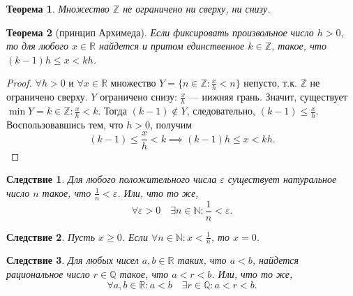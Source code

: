 \documentclass[a4paper,12pt]{article} %
\newtheorem{theorem}{Теорема}[section]
\newtheorem{corollary}{Следствие}[theorem]
\theoremstyle{remark}
\theoremstyle{definition}
\begin{document}
\begin{theorem}
    Множество $\mathbb{Z}$ не ограничено ни сверху, ни снизу.
\end{theorem}

\begin{theorem}[принцип Архимеда]
    Если фиксировать произвольное число $h>0$, то для любого $x\in \mathbb{R}$ найдется и притом единственное $k\in \mathbb{Z}$,
    такое, что $(k-1)h \le  x < kh$.
\end{theorem}
\begin{proof}
    $\forall h>0$ и $\forall x \in \mathbb{R}$ множество $\displaystyle Y = \{n \in \mathbb{Z} : \frac{x}{h} < n\}$ непусто,
    т.к. $\mathbb{Z}$ не ограничено сверху. $Y$ ограничено снизу: $\displaystyle \frac{x}{h}$ --- нижняя грань.
    Значит, существует $\displaystyle \min Y = k\in \mathbb{Z} : \frac{x}{h} < k$. Тогда $(k-1)\not \in Y$,
    следовательно, $\displaystyle (k-1) \le \frac{x}{h}$. Воспользовавшись тем, что $h > 0$, получим
    \[(k-1)\le \frac{x}{h} < k \implies (k-1)h \le x < kh.\] 
\end{proof}
\begin{corollary}
    Для любого положительного числа $\varepsilon$ существует натуральное число $n$ такое,
    что $\displaystyle \frac{1}{n} < \varepsilon$. Или, что то же,
    \[\forall \varepsilon > 0 \quad \exists n \in \mathbb{N} : \frac{1}{n} < \varepsilon.\] 
\end{corollary}
\begin{corollary}
    Пусть $x\ge 0$. Если $\displaystyle \forall n \in \mathbb{N} : x < \frac{1}{n}$, то $x=0$.
\end{corollary}
\begin{corollary}
    Для любых чисел $a, b \in \mathbb{R}$ таких, что $a < b$, найдется рациональное число $r\in \mathbb{Q}$ такое,
    что $a < r < b$. Или, что то же,
    \[\forall a, b \in \mathbb{R} : a < b \quad \exists r \in \mathbb{Q} : a < r < b.\] 
\end{corollary}
\end{document}
